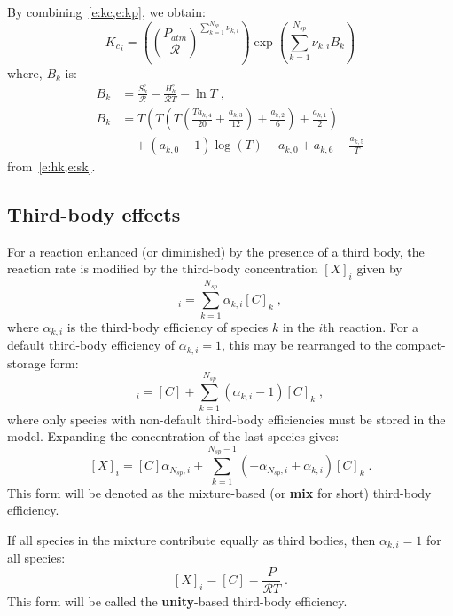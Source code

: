 \documentclass[12pt]{article}
\newcommand{\ns}{N_{sp}}
\newcommand{\Ru}{\mathcal{R}}
\begin{document}
By combining~\cref{e:kc,e:kp}, we obtain:
\begin{equation}
 \label{e:kc_in_kp}
 {K_c}_{i} = \left(\left(\frac{P_{atm}}{\Ru}\right)^{\sum_{k=1}^{\ns} \nu_{k,i}}\right) \operatorname{exp}\left({\sum_{k=1}^{\ns} \nu_{k,i} B_{k}}\right)
\end{equation}
where, $B_k$ is:
\begin{align}
 \label{e:Bk}
 B_{k} &= \frac{S^{\circ}_k}{\Ru} - \frac{H^{\circ}_k}{\Ru T} - \ln{T} \nonumber\; , \\
 B_{k} &= T \left(T \left(T \left(\frac{T a_{k,4}}{20} + \frac{a_{k,3}}{12}\right) + \frac{a_{k,2}}{6}\right) + \frac{a_{k,1}}{2}\right) \nonumber \\
       & \quad + \left(a_{k,0} - 1\right) \log{\left (T \right )} - a_{k,0} + a_{k,6} - \frac{a_{k,5}}{T}
\end{align}
from~\cref{e:hk,e:sk}.

\subsection{Third-body effects}
\label{s:thdbody}

For a reaction enhanced (or diminished) by the presence of a third body, the reaction rate is modified by the third-body concentration $[X]_i$ given by
\begin{equation}
[X]_{i} = \sum_{k=1}^{\ns} \alpha_{k,i} [C]_{k} \;,
\end{equation}
where $\alpha_{k,i}$ is the third-body efficiency of species $k$ in the $i$th reaction.
For a default third-body efficiency of $\alpha_{k,i} = 1$, this may be rearranged to the compact-storage form:
\begin{equation}
 [X]_{i} = [C] + \sum_{k=1}^{\ns} \left(\alpha_{k,i} - 1\right) [C]_{k} \;,
\end{equation}
where only species with non-default third-body efficiencies must be stored in the model.
Expanding the concentration of the last species gives:
\begin{equation}
\label{e:thd_mix}
 [X]_{i}=[C] \alpha_{\ns,i} + \sum_{k=1}^{\ns  - 1} \left(- \alpha_{\ns,i} + \alpha_{k,i}\right) [C]_{k}\;.
\end{equation}
This form will be denoted as the mixture-based (or \textbf{mix} for short) third-body efficiency.

If all species in the mixture contribute equally as third bodies, then $\alpha_{k,i} = 1$ for all species:
\begin{equation}
\label{e:thd_unity}
 [X]_{i} = [C] = \frac{P}{\Ru T} \;.
\end{equation}
This form will be called the \textbf{unity}-based third-body efficiency.
\end{document}

